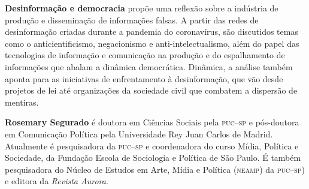 \textbf{Desinformação e democracia} propõe uma reflexão sobre a indústria de produção e disseminação de informações falsas. A partir das redes de desinformação criadas durante a pandemia do coronavírus, são discutidos temas como o anticientificismo, negacionismo e anti-intelectualismo, além do papel das tecnologias de informação e comunicação na produção e do espalhamento de informações que abalam a dinâmica democrática. Dinâmica, a análise também aponta para as iniciativas de enfrentamento à desinformação, que vão desde projetos de lei até organizações da sociedade civil que combatem a dispersão de mentiras. 

\textbf{Rosemary Segurado} é doutora em Ciências Sociais pela \textsc{puc--sp} e pós-doutora em Comunicação Política pela Universidade Rey Juan Carlos de Madrid. Atualmente é pesquisadora da \textsc{puc--sp} e coordenadora do curso Mídia, Política e Sociedade, da Fundação Escola de Sociologia e Política de São Paulo. É também pesquisadora do Núcleo de Estudos em Arte, Mídia e Política (\textsc{neamp}) da  \textsc{puc--sp}) e editora da \textit{Revista Aurora}.


